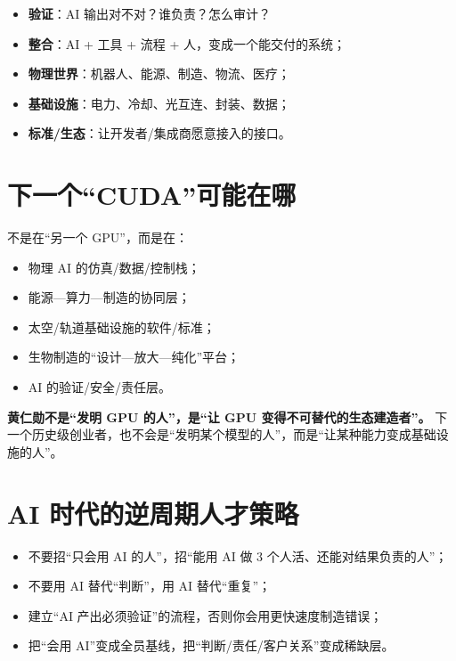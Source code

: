 \begin{itemize}
\tightlist
\item
  \textbf{验证}：AI 输出对不对？谁负责？怎么审计？
\item
  \textbf{整合}：AI + 工具 + 流程 + 人，变成一个能交付的系统；
\item
  \textbf{物理世界}：机器人、能源、制造、物流、医疗；
\item
  \textbf{基础设施}：电力、冷却、光互连、封装、数据；
\item
  \textbf{标准/生态}：让开发者/集成商愿意接入的接口。
\end{itemize}

\section{下一个``CUDA''可能在哪}\label{ux4e0bux4e00ux4e2acudaux53efux80fdux5728ux54ea}

不是在``另一个 GPU''，而是在：

\begin{itemize}
\tightlist
\item
  物理 AI 的仿真/数据/控制栈；
\item
  能源---算力---制造的协同层；
\item
  太空/轨道基础设施的软件/标准；
\item
  生物制造的``设计---放大---纯化''平台；
\item
  AI 的验证/安全/责任层。
\end{itemize}

\textbf{黄仁勋不是``发明 GPU 的人''，是``让 GPU
变得不可替代的生态建造者''。}
下一个历史级创业者，也不会是``发明某个模型的人''，而是``让某种能力变成基础设施的人''。

\section{AI
时代的逆周期人才策略}\label{ai-ux65f6ux4ee3ux7684ux9006ux5468ux671fux4ebaux624dux7b56ux7565}

\begin{itemize}
\tightlist
\item
  不要招``只会用 AI 的人''，招``能用 AI 做 3
  个人活、还能对结果负责的人''；
\item
  不要用 AI 替代``判断''，用 AI 替代``重复''；
\item
  建立``AI 产出必须验证''的流程，否则你会用更快速度制造错误；
\item
  把``会用 AI''变成全员基线，把``判断/责任/客户关系''变成稀缺层。
\end{itemize}

